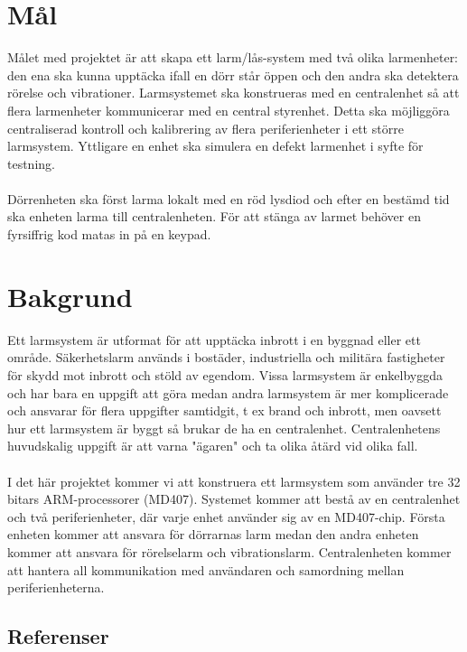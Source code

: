\documentclass[a4paper]{article}
\begin{document}
\section{Mål}
Målet med projektet är att skapa ett larm/lås-system med två olika larmenheter: den ena ska kunna upptäcka ifall en dörr står öppen och den andra ska detektera rörelse och vibrationer. Larmsystemet ska konstrueras med en centralenhet så att flera larmenheter kommunicerar med en central styrenhet. Detta ska möjliggöra centraliserad kontroll och kalibrering av flera periferienheter i ett större larmsystem. Yttligare en enhet ska simulera en defekt larmenhet i syfte för testning.
\\\\
Dörrenheten ska först larma lokalt med en röd lysdiod och efter en bestämd tid ska enheten larma till centralenheten. För att stänga av larmet behöver en fyrsiffrig kod matas in på en keypad.

\section{Bakgrund}
Ett larmsystem är utformat för att upptäcka inbrott i en byggnad eller ett område. Säkerhetslarm används i bostäder, industriella och militära fastigheter för skydd mot inbrott och stöld av egendom. Vissa larmsystem är enkelbyggda och har bara en uppgift att göra medan andra larmsystem är mer komplicerade och ansvarar för flera uppgifter samtidgit, t ex brand och inbrott, men oavsett hur ett larmsystem är byggt så brukar de ha en centralenhet. Centralenhetens huvudskalig uppgift är att varna "ägaren" och ta olika åtärd vid olika fall.
\\\\
I det här projektet kommer vi att konstruera ett larmsystem som använder tre 32 bitars ARM-processorer (MD407). Systemet kommer att bestå av en centralenhet och två periferienheter, där varje enhet använder sig av en MD407-chip. Första enheten kommer att ansvara för dörrarnas larm medan den andra enheten kommer att ansvara för rörelselarm och vibrationslarm. Centralenheten kommer att hantera all kommunikation med användaren och samordning mellan periferienheterna. 


\subsection{Referenser}
\renewcommand*{\refname}{}
\vspace{-1cm}
\end{document}
